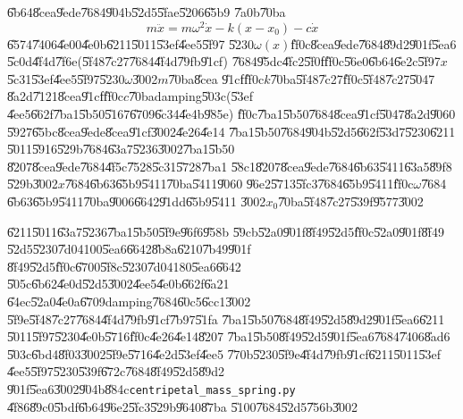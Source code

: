 \U{6b64}\U{8cea}\U{9ede}\U{7684}\U{904b}\U{52d5}\U{5fae}\U{5206}\U{65b9}%
\U{7a0b}\U{70ba}%
\begin{equation*}
m\ddot{x}=m\omega ^{2}\dot{x}-k\left( x-x_{0}\right) -c\dot{x}
\end{equation*}%
\U{6574}\U{7406}\U{4e00}\U{4e0b}\U{6211}\U{5011}\U{53ef}\U{4ee5}\U{5f97}%
\U{5230}$\omega (x)$\U{ff0c}\U{8cea}\U{9ede}\U{7684}\U{89d2}\U{901f}\U{5ea6}%
\U{5c0d}\U{4f4d}\U{7f6e}(\U{5f48}\U{7c27}\U{7684}\U{4f4d}\U{79fb}\U{91cf})%
\U{7684}\U{95dc}\U{4fc2}\U{5f0f}\U{ff0c}\U{56e0}\U{6b64}\U{6e2c}\U{5f97}$x$%
\U{5c31}\U{53ef}\U{4ee5}\U{5f97}\U{5230}$\omega $\U{3002}$m$\U{70ba}\U{8cea}%
\U{91cf}\U{ff0c}$k$\U{70ba}\U{5f48}\U{7c27}\U{ff0c}\U{5f48}\U{7c27}\U{5047}%
\U{8a2d}\U{7121}\U{8cea}\U{91cf}\U{ff0c}$c$\U{70ba}damping\U{503c}(\U{53ef}%
\U{4ee5}\U{662f}\U{7ba1}\U{5b50}\U{5167}\U{6709}\U{6c34}\U{4e4b}\U{985e})%
\U{ff0c}\U{7ba1}\U{5b50}\U{7684}\U{8cea}\U{91cf}\U{5047}\U{8a2d}\U{9060}%
\U{5927}\U{65bc}\U{8cea}\U{9ede}\U{8cea}\U{91cf}\U{3002}\U{4e26}\U{4e14}%
\U{7ba1}\U{5b50}\U{7684}\U{904b}\U{52d5}\U{662f}\U{53d7}\U{5230}\U{6211}%
\U{5011}\U{5916}\U{529b}\U{7684}\U{63a7}\U{5236}\U{3002}\U{7ba1}\U{5b50}%
\U{8207}\U{8cea}\U{9ede}\U{7684}\U{4f5c}\U{7528}\U{5c31}\U{5728}\U{7ba1}%
\U{58c1}\U{8207}\U{8cea}\U{9ede}\U{7684}\U{6b63}\U{5411}\U{63a5}\U{89f8}%
\U{529b}\U{3002}$x$\U{7684}\U{6b63}\U{65b9}\U{5411}\U{70ba}\U{5411}\U{9060}%
\U{96e2}\U{5713}\U{5fc3}\U{7684}\U{65b9}\U{5411}\U{ff0c}$\omega $\U{7684}%
\U{6b63}\U{65b9}\U{5411}\U{70ba}\U{9006}\U{6642}\U{91dd}\U{65b9}\U{5411}%
\U{3002}$x_{0}$\U{70ba}\U{5f48}\U{7c27}\U{539f}\U{9577}\U{3002}

\U{6211}\U{5011}\U{63a7}\U{5236}\U{7ba1}\U{5b50}\U{5f9e}\U{96f6}\U{958b}%
\U{59cb}\U{52a0}\U{901f}\U{8f49}\U{52d5}\U{ff0c}\U{52a0}\U{901f}\U{8f49}%
\U{52d5}\U{5230}\U{7d04}100\U{5ea6}\U{6642}\U{8b8a}\U{6210}\U{7b49}\U{901f}%
\U{8f49}\U{52d5}\U{ff0c}\U{6700}\U{5f8c}\U{5230}\U{7d04}180\U{5ea6}\U{6642}%
\U{505c}\U{6b62}\U{4e0d}\U{52d5}\U{3002}\U{4ee5}\U{4e0b}\U{662f}\U{6a21}%
\U{64ec}\U{52a0}\U{4e0a}\U{6709}damping\U{7684}\U{60c5}\U{6cc1}\U{3002}%
\U{5f9e}\U{5f48}\U{7c27}\U{7684}\U{4f4d}\U{79fb}\U{91cf}\U{7b97}\U{51fa}%
\U{7ba1}\U{5b50}\U{7684}\U{8f49}\U{52d5}\U{89d2}\U{901f}\U{5ea6}\U{6211}%
\U{5011}\U{5f97}\U{5230}\U{4e0b}\U{5716}\U{ff0c}\U{4e26}\U{4e14}\U{8207}%
\U{7ba1}\U{5b50}\U{8f49}\U{52d5}\U{901f}\U{5ea6}\U{7684}\U{7406}\U{8ad6}%
\U{503c}\U{6bd4}\U{8f03}\U{3002}\U{5f9e}\U{5716}\U{4e2d}\U{53ef}\U{4ee5}%
\U{770b}\U{5230}\U{5f9e}\U{4f4d}\U{79fb}\U{91cf}\U{6211}\U{5011}\U{53ef}%
\U{4ee5}\U{5f97}\U{5230}\U{539f}\U{672c}\U{7684}\U{8f49}\U{52d5}\U{89d2}%
\U{901f}\U{5ea6}\U{3002}\U{904b}\U{884c}\texttt{centripetal\_mass\_spring.py}%
\U{4f86}\U{89c0}\U{5bdf}\U{6b64}\U{96e2}\U{5fc3}\U{529b}\U{9640}\U{87ba}%
\U{5100}\U{7684}\U{52d5}\U{756b}\U{3002}

